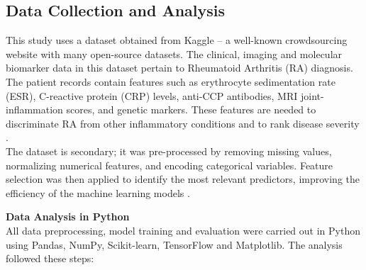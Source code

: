 \documentclass[10pt]{NSP1}
\begin{document}
	\subsection{Data Collection and Analysis}
	This study uses a dataset obtained from Kaggle -- a well-known crowdsourcing website with many open-source datasets. The clinical, imaging and molecular biomarker data in this dataset pertain to Rheumatoid Arthritis (RA) diagnosis. The patient records contain features such as erythrocyte sedimentation rate (ESR), C-reactive protein (CRP) levels, anti-CCP antibodies, MRI joint-inflammation scores, and genetic markers. These features are needed to discriminate RA from other inflammatory conditions and to rank disease severity \cite{zhou2021multidti}.\\
	The dataset is secondary; it was pre-processed by removing missing values, normalizing numerical features, and encoding categorical variables. Feature selection was then applied to identify the most relevant predictors, improving the efficiency of the machine learning models \cite{pei2023review}.
	
	\textbf{Data Analysis in Python}\\
	All data preprocessing, model training and evaluation were carried out in Python using Pandas, NumPy, Scikit-learn, TensorFlow and Matplotlib. The analysis followed these steps:
	
\end{document}

